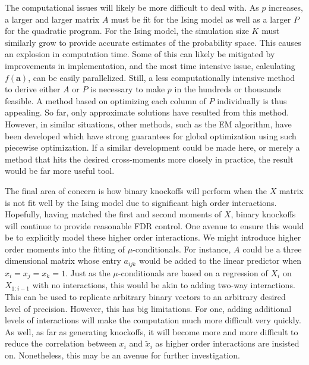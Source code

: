 \documentclass[11pt]{article}
\theoremstyle{definition}
\begin{document}
    The computational issues will likely be more difficult to deal with. As $p$ increases, a larger and larger matrix $A$ must be fit for the Ising model as well as a larger $P$ for the quadratic program. For the Ising model, the simulation size $K$ must similarly grow to provide accurate estimates of the probability space. This causes an explosion in computation time. Some of this can likely be mitigated by improvements in implementation, and the most time intensive issue, calculating $f(\mathbf a)$, can be easily parallelized. Still, a less computationally intensive method to derive either $A$ or $P$ is necessary to make $p$ in the hundreds or thousands feasible. A method based on optimizing each column of $P$ individually is thus appealing. So far, only approximate solutions have resulted from this method. However, in similar situations, other methods, such as the EM algorithm, have been developed which have strong guarantees for global optimization using such piecewise optimization. If a similar development could be made here, or merely a method that hits the desired cross-moments more closely in practice, the result would be far more useful tool. \par
    The final area of concern is how binary knockoffs will perform when the $X$ matrix is not fit well by the Ising model due to significant high order interactions. Hopefully, having matched the first and second moments of $X$, binary knockoffs will continue to provide reasonable FDR control. One avenue to ensure this would be to explicitly model these higher order interactions. We might introduce higher order moments into the fitting of $\mu$-conditionals. For instance, $A$ could be a three dimensional matrix whose entry $a_{ijk}$ would be added to the linear predictor when $x_i=x_j=x_k=1$. Just as the $\mu$-conditionals are based on a regression of $X_i$ on $X_{1:i-1}$ with no interactions, this would be akin to adding two-way interactions. This can be used to replicate arbitrary binary vectors to an arbitrary desired level of precision. However, this has big limitations. For one, adding additional levels of interactions will make the computation much more difficult very quickly. As well, as far as generating knockoffs, it will become more and more difficult to reduce the correlation between $x_i$ and $\tilde x_i$ as higher order interactions are insisted on. Nonetheless, this may be an avenue for further investigation. \par
   
\nocite{*}
\printbibliography[heading=bibintoc]
\end{document}
